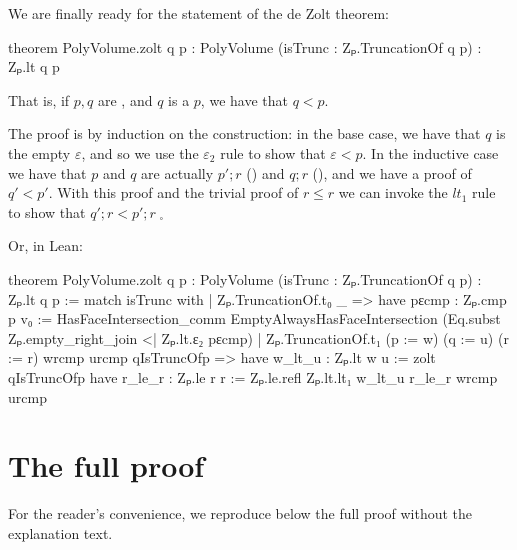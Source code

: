 \documentclass[12pt]{article} %
\begin{document}
{We are finally ready for the statement of the de Zolt theorem: %
\begin{leancode}
theorem PolyVolume.zolt {q p : PolyVolume}
  (isTrunc : Zₚ.TruncationOf q p)
  : Zₚ.lt q p
\end{leancode}
That is, if \(p, q\) are \pvolume, and \(q\) is a \truncof{} \(p\), we have that \(q < p\). %

The proof is by induction on the \truncof{} construction: in the base case, we have that \(q\) is the empty \pvolume{} \(\varepsilon\), and so we use the
\(\varepsilon_2\) rule to show that \(\varepsilon < p\). %
In the inductive case we have that \(p\) and \(q\) are actually \(p';r\) () and \(q;r\) (), and we
have a proof of \(q' < p'\). %
With this proof and the trivial proof of \(r \leq r\) we can invoke the \(lt_1\) rule to show that \(q';r < p';r\;_\square\) %

Or, in Lean: %

\begin{leancode}
theorem PolyVolume.zolt {q p : PolyVolume}
  (isTrunc : Zₚ.TruncationOf q p)
  : Zₚ.lt q p :=
  match isTrunc with
  | Zₚ.TruncationOf.t₀ _ =>
      have pεcmp : Zₚ.cmp p v₀
        := HasFaceIntersection_comm EmptyAlwaysHasFaceIntersection
      (Eq.subst Zₚ.empty_right_join <| Zₚ.lt.ε₂ pεcmp)
  | Zₚ.TruncationOf.t₁ (p := w) (q := u) (r := r) wrcmp urcmp qIsTruncOfp =>
    have w_lt_u : Zₚ.lt w u := zolt qIsTruncOfp
    have r_le_r : Zₚ.le r r := Zₚ.le.refl
    Zₚ.lt.lt₁ w_lt_u r_le_r wrcmp urcmp
\end{leancode} %

\section{The full proof}\label{sec:de-zolt-theorem} %

For the reader's convenience, we reproduce below the full proof without the explanation text. %



}

\printbibliography{}
\end{document}
